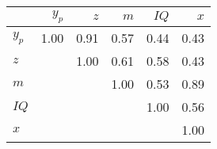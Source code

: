\begin{tabular}{lrrrrr}
\hline
 & $y_{p}$  & $z$  & $m$  & $IQ$  & $x$  \\ 
\hline
$y_{p}$ & 1.00  & 0.91  & 0.57  & 0.44  & 0.43  \\ 
$z$ &   & 1.00  & 0.61  & 0.58  & 0.43  \\ 
$m$ &   &   & 1.00  & 0.53  & 0.89  \\ 
$IQ$ &   &   &   & 1.00  & 0.56  \\ 
$x$ &   &   &   &   & 1.00  \\ 
\hline
\end{tabular}%
